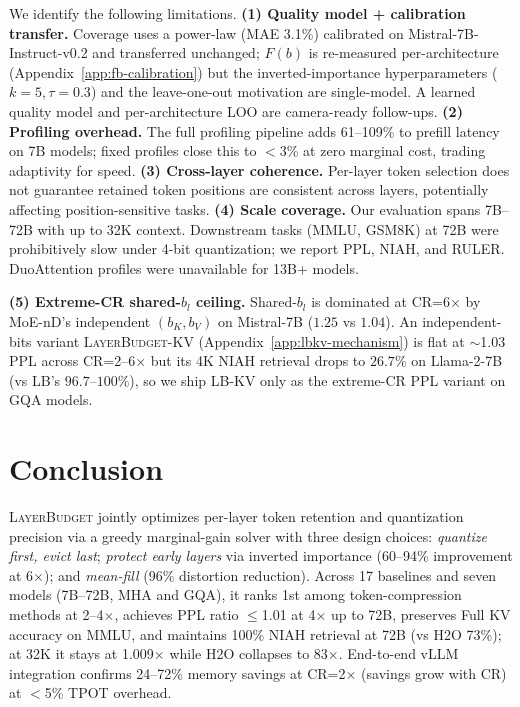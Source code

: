 \documentclass{article}
\newcommand{\layerbudget}{\textsc{LayerBudget}\xspace}
\begin{document}
We identify the following limitations.
\textbf{(1) Quality model + calibration transfer.}
Coverage uses a power-law (MAE 3.1\%) calibrated on Mistral-7B-Instruct-v0.2 and transferred unchanged; $F(b)$ is re-measured per-architecture (Appendix~\ref{app:fb-calibration}) but the inverted-importance hyperparameters ($k{=}5, \tau{=}0.3$) and the leave-one-out motivation are single-model. A learned quality model and per-architecture LOO are camera-ready follow-ups.
\textbf{(2) Profiling overhead.}
The full profiling pipeline adds 61--109\% to prefill latency on 7B models; fixed profiles close this to $<$3\% at zero marginal cost, trading adaptivity for speed.
\textbf{(3) Cross-layer coherence.}
Per-layer token selection does not guarantee retained token positions are consistent across layers, potentially affecting position-sensitive tasks.
\textbf{(4) Scale coverage.}
Our evaluation spans 7B--72B with up to 32K context. Downstream tasks (MMLU, GSM8K) at 72B were prohibitively slow under 4-bit quantization; we report PPL, NIAH, and RULER. DuoAttention profiles were unavailable for 13B+ models.

\textbf{(5) Extreme-CR shared-$b_l$ ceiling.}
Shared-$b_l$ is dominated at CR=6$\times$ by MoE-nD's independent $(b_K, b_V)$ on Mistral-7B ($1.25$ vs $1.04$). An independent-bits variant \layerbudget-KV (Appendix~\ref{app:lbkv-mechanism}) is flat at $\sim$1.03 PPL across CR=2--6$\times$ but its 4K NIAH retrieval drops to $26.7\%$ on Llama-2-7B (vs LB's $96.7$--$100\%$), so we ship LB-KV only as the extreme-CR PPL variant on GQA models.

\section{Conclusion}
\label{sec:conclusion}

\layerbudget jointly optimizes per-layer token retention and quantization precision via a greedy marginal-gain solver with three design choices: \emph{quantize first, evict last}; \emph{protect early layers} via inverted importance (60--94\% improvement at 6$\times$); and \emph{mean-fill} (96\% distortion reduction). Across 17 baselines and seven models (7B--72B, MHA and GQA), it ranks 1st among token-compression methods at 2--4$\times$, achieves PPL ratio $\leq$1.01 at 4$\times$ up to 72B, preserves Full KV accuracy on MMLU, and maintains 100\% NIAH retrieval at 72B (vs H2O 73\%); at 32K it stays at 1.009$\times$ while H2O collapses to 83$\times$. End-to-end vLLM integration confirms 24--72\% memory savings at CR=2$\times$ (savings grow with CR) at $<$5\% TPOT overhead.
\end{document}
